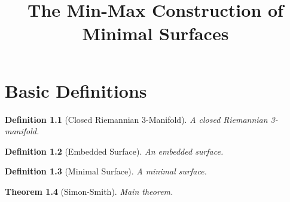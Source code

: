 \documentclass{report}
\title{The Min-Max Construction of Minimal Surfaces}
\newtheorem{theorem}{Theorem}[chapter]
\newtheorem{definition}[theorem]{Definition}
\begin{document}
\maketitle

\chapter{Basic Definitions}

\begin{definition}[Closed Riemannian 3-Manifold]
\label{def:closed_manifold}
\leanok
A closed Riemannian 3-manifold.
\end{definition}

\begin{definition}[Embedded Surface]
\label{def:surface}
An embedded surface.
\end{definition}

\begin{definition}[Minimal Surface]
\label{def:minimal}
A minimal surface.
\end{definition}

\begin{theorem}[Simon-Smith]
\label{thm:main}
Main theorem.
\end{theorem}
\end{document}
